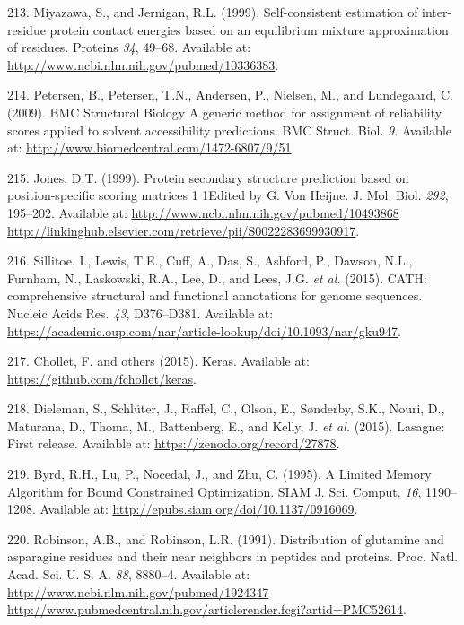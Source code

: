 \documentclass[11pt,a4paper,twoside]{book}
\theoremstyle{definition}
\theoremstyle{definition}
\theoremstyle{remark}
\begin{document}
\hypertarget{ref-Miyazawa1999a}{}
213. Miyazawa, S., and Jernigan, R.L. (1999). Self-consistent estimation
of inter-residue protein contact energies based on an equilibrium
mixture approximation of residues. Proteins \emph{34}, 49--68. Available
at: \url{http://www.ncbi.nlm.nih.gov/pubmed/10336383}.

\hypertarget{ref-Petersen2009a}{}
214. Petersen, B., Petersen, T.N., Andersen, P., Nielsen, M., and
Lundegaard, C. (2009). BMC Structural Biology A generic method for
assignment of reliability scores applied to solvent accessibility
predictions. BMC Struct. Biol. \emph{9}. Available at:
\url{http://www.biomedcentral.com/1472-6807/9/51}.

\hypertarget{ref-Jones1999}{}
215. Jones, D.T. (1999). Protein secondary structure prediction based on
position-specific scoring matrices 1 1Edited by G. Von Heijne. J. Mol.
Biol. \emph{292}, 195--202. Available at:
\href{http://www.ncbi.nlm.nih.gov/pubmed/10493868\%20http://linkinghub.elsevier.com/retrieve/pii/S0022283699930917}{http://www.ncbi.nlm.nih.gov/pubmed/10493868 http://linkinghub.elsevier.com/retrieve/pii/S0022283699930917}.

\hypertarget{ref-Sillitoe2015}{}
216. Sillitoe, I., Lewis, T.E., Cuff, A., Das, S., Ashford, P., Dawson,
N.L., Furnham, N., Laskowski, R.A., Lee, D., and Lees, J.G. \emph{et
al.} (2015). CATH: comprehensive structural and functional annotations
for genome sequences. Nucleic Acids Res. \emph{43}, D376--D381.
Available at:
\url{https://academic.oup.com/nar/article-lookup/doi/10.1093/nar/gku947}.

\hypertarget{ref-Chollet2015}{}
217. Chollet, F. and others (2015). Keras. Available at:
\url{https://github.com/fchollet/keras}.

\hypertarget{ref-Dieleman2015}{}
218. Dieleman, S., Schlüter, J., Raffel, C., Olson, E., Sønderby, S.K.,
Nouri, D., Maturana, D., Thoma, M., Battenberg, E., and Kelly, J.
\emph{et al.} (2015). Lasagne: First release. Available at:
\url{https://zenodo.org/record/27878}.

\hypertarget{ref-Byrd1995}{}
219. Byrd, R.H., Lu, P., Nocedal, J., and Zhu, C. (1995). A Limited
Memory Algorithm for Bound Constrained Optimization. SIAM J. Sci.
Comput. \emph{16}, 1190--1208. Available at:
\url{http://epubs.siam.org/doi/10.1137/0916069}.

\hypertarget{ref-Robinson1991}{}
220. Robinson, A.B., and Robinson, L.R. (1991). Distribution of
glutamine and asparagine residues and their near neighbors in peptides
and proteins. Proc. Natl. Acad. Sci. U. S. A. \emph{88}, 8880--4.
Available at:
\href{http://www.ncbi.nlm.nih.gov/pubmed/1924347\%20http://www.pubmedcentral.nih.gov/articlerender.fcgi?artid=PMC52614}{http://www.ncbi.nlm.nih.gov/pubmed/1924347 http://www.pubmedcentral.nih.gov/articlerender.fcgi?artid=PMC52614}.
\end{document}
